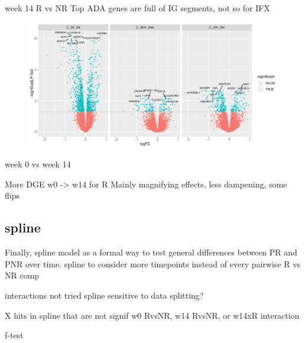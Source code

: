 \begin{outline}
week 14 R vs NR
    Top ADA genes are full of IG segments, not so for IFX

\begin{figure}
    \centering
    \includegraphics[width=1.0\textwidth,page=1]{mainmatter/figures/chapter_04/plot_gene_set_enrichment.volcano_C_3R_3N,C_3RI_3NI,C_3RA_3NA.pdf}
    \caption{}
    \label{fig:multipants_dge_volcano_week_14}
\end{figure}

week 0 vs week 14

    More DGE w0 -> w14 for R
    Mainly magnifying effects, less dampening, some flips

\subsection{spline}

Finally, spline model as a formal way to test general differences between PR and PNR over time.
spline to consider more timepoints instead of every pairwise R vs NR comp 

interactions not tried
    spline sensitive to data splitting?

X hits in spline that are not signif w0 RvsNR, w14 RvsNR, or w14xR interaction

f-test


\end{outline}

